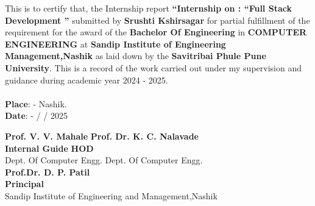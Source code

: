 \begin{titlepage}
\vspace{-1cm}
\onehalfspacing
\normalsize
{This is to certify that, the Internship report {\bf``Internship on :  \textquotedblleft Full Stack Development ''} submitted by \hspace{0.05in} {\bf Srushti Kshirsagar }  for partial fulfillment of the requirement for the award of the \textbf{Bachelor Of Engineering} in \textbf{COMPUTER ENGINEERING} at \textbf{Sandip Institute of Engineering
Management,Nashik} as laid down by the {\bf Savitribai Phule Pune University}. This is a record of the work carried out under my supervision and guidance during academic year 2024 - 2025.} \\
\\
{\bf Place}: - Nashik.\\	
{\bf Date}: -  /  /  2025\\
\vspace{0.5cm}
\begin{flushleft}
\vspace{0.5cm}
{{\hspace{0.3in}\bf Prof. V. V. Mahale } {\hspace{1.2in} \bf Prof. Dr. K. C. Nalavade }}\\
{{\bf\hspace{0.5in}Internal Guide}  \hspace{2.2in} \bf HOD}\\
{\hspace{0.3in}\small Dept. Of Computer Engg. \hspace{1.2in}Dept. Of Computer Engg.}\\
\vspace{0.7in}
{\hspace{2in}\bf Prof.Dr. D. P. Patil}\\
{  \hspace{2.2in} \bf Principal}\\
{\hspace{0.9in}\small Sandip Institute of Engineering and Management,Nashik}\\		
\end{flushleft}
\end{titlepage}